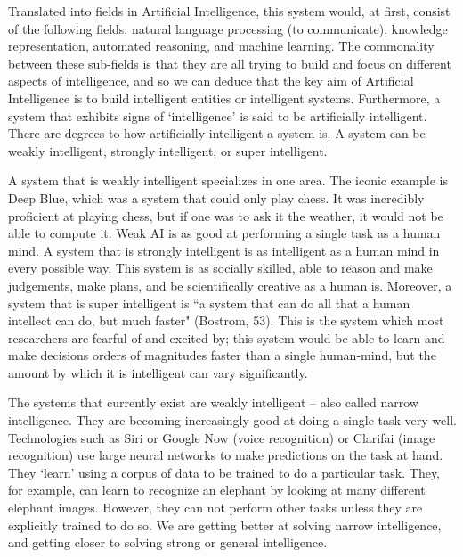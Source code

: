 \documentclass[11pt]{article}
\begin{document}
\par Translated into fields in Artificial Intelligence, this system would, at first, consist of the following fields: natural language processing (to communicate), knowledge representation, automated reasoning, and machine learning. The commonality between these sub-fields is that they are all trying to build and focus on different aspects of intelligence, and so we can deduce that the key aim of Artificial Intelligence is to build intelligent entities or intelligent systems. Furthermore, a system that exhibits signs of `intelligence' is said to be artificially intelligent. There are degrees to how artificially intelligent a system is. A system can be weakly intelligent, strongly intelligent, or super intelligent.

\par A system that is weakly intelligent specializes in one area. The iconic example is Deep Blue, which was a system that could only play chess. It was incredibly proficient at playing chess, but if one was to ask it the weather, it would not be able to compute it. Weak AI is as good at performing a single task as a human mind. A system that is strongly intelligent is as intelligent as a human mind in every possible way. This system is as socially skilled, able to reason and make judgements, make plans, and be scientifically creative as a human is. Moreover, a system that is super intelligent is ``a system that can do all that a human intellect can do, but much faster" (Bostrom, 53). This is the system which most researchers are fearful of and excited by; this system would be able to learn and make decisions orders of magnitudes faster than a single human-mind, but the amount by which it is intelligent can vary significantly.

\par The systems that currently exist are weakly intelligent -- also called narrow intelligence. They are becoming increasingly good at doing a single task very well. Technologies such as Siri or Google Now (voice recognition) or Clarifai (image recognition) use large neural networks to make predictions on the task at hand. They `learn' using a corpus of data to be trained to do a particular task. They, for example, can learn to recognize an elephant by looking at many different elephant images. However, they can not perform other tasks unless they are explicitly trained to do so. We are getting better at solving narrow intelligence, and getting closer to solving strong or general intelligence.
\end{document}
